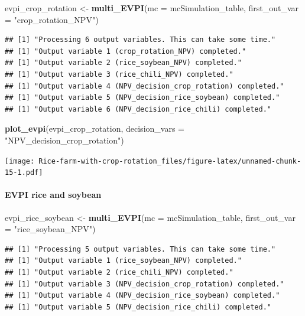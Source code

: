 \documentclass[
]{article}
\newenvironment{Shaded}{\begin{snugshade}}{\end{snugshade}}
\newcommand{\AttributeTok}[1]{\textcolor[rgb]{0.13,0.29,0.53}{#1}}
\newcommand{\FunctionTok}[1]{\textcolor[rgb]{0.13,0.29,0.53}{\textbf{#1}}}
\newcommand{\NormalTok}[1]{#1}
\newcommand{\OtherTok}[1]{\textcolor[rgb]{0.56,0.35,0.01}{#1}}
\newcommand{\StringTok}[1]{\textcolor[rgb]{0.31,0.60,0.02}{#1}}
\begin{document}
\begin{Shaded}
\begin{Highlighting}[]
\NormalTok{evpi\_crop\_rotation }\OtherTok{\textless{}{-}} \FunctionTok{multi\_EVPI}\NormalTok{(}\AttributeTok{mc =}\NormalTok{ mcSimulation\_table, }\AttributeTok{first\_out\_var =} \StringTok{"crop\_rotation\_NPV"}\NormalTok{)}
\end{Highlighting}
\end{Shaded}

\begin{verbatim}
## [1] "Processing 6 output variables. This can take some time."
## [1] "Output variable 1 (crop_rotation_NPV) completed."
## [1] "Output variable 2 (rice_soybean_NPV) completed."
## [1] "Output variable 3 (rice_chili_NPV) completed."
## [1] "Output variable 4 (NPV_decision_crop_rotation) completed."
## [1] "Output variable 5 (NPV_decision_rice_soybean) completed."
## [1] "Output variable 6 (NPV_decision_rice_chili) completed."
\end{verbatim}

\begin{Shaded}
\begin{Highlighting}[]
\FunctionTok{plot\_evpi}\NormalTok{(evpi\_crop\_rotation, }\AttributeTok{decision\_vars =} \StringTok{"NPV\_decision\_crop\_rotation"}\NormalTok{)}
\end{Highlighting}
\end{Shaded}

\texttt{[image: Rice-farm-with-crop-rotation\_files/figure-latex/unnamed-chunk-15-1.pdf]}

\hypertarget{evpi-rice-and-soybean}{%
\paragraph{EVPI rice and soybean}\label{evpi-rice-and-soybean}}

\begin{Shaded}
\begin{Highlighting}[]
\NormalTok{evpi\_rice\_soybean }\OtherTok{\textless{}{-}} \FunctionTok{multi\_EVPI}\NormalTok{(}\AttributeTok{mc =}\NormalTok{ mcSimulation\_table, }\AttributeTok{first\_out\_var =} \StringTok{"rice\_soybean\_NPV"}\NormalTok{)}
\end{Highlighting}
\end{Shaded}

\begin{verbatim}
## [1] "Processing 5 output variables. This can take some time."
## [1] "Output variable 1 (rice_soybean_NPV) completed."
## [1] "Output variable 2 (rice_chili_NPV) completed."
## [1] "Output variable 3 (NPV_decision_crop_rotation) completed."
## [1] "Output variable 4 (NPV_decision_rice_soybean) completed."
## [1] "Output variable 5 (NPV_decision_rice_chili) completed."
\end{verbatim}
\end{document}
